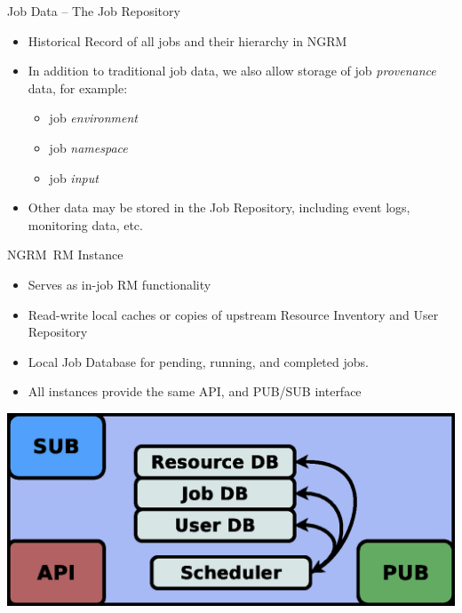 \documentclass[default,pdf,colorBG,slideColor]{prosper}
\newcommand{\ngrm}{NGRM}
\begin{document}
\begin{slide}{Job Data -- The Job Repository}
\begin{itemize}
 \item Historical Record of all jobs and their hierarchy in \ngrm\
 \item In addition to traditional job data, we also allow storage of
       job \emph{provenance} data, for example:
 \begin{itemize}
  \item job \emph{environment}
  \item job \emph{namespace}
  \item job \emph{input}
 \end{itemize}
 \item Other data may be stored in the Job Repository, including
        event logs, monitoring data, etc.
\end{itemize}
\end{slide}

\begin{slide}{\ngrm\ RM Instance}
\begin{itemize}
 \item Serves as in-job RM functionality
 \item Read-write local caches or copies of upstream Resource Inventory and
        User Repository
 \item Local Job Database for pending, running, and completed jobs.
 \item All instances provide the same API, and PUB/SUB interface
\end{itemize}
\begin{center}
  \includegraphics[scale=0.33]{RM-instance}
\end{center}
\end{slide}
\end{document}
